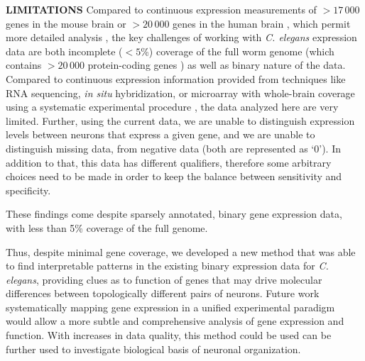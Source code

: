 \documentclass[10pt,letterpaper]{article}
\begin{document}
{\textbf{LIMITATIONS}
Compared to continuous expression measurements of $>17\,000$ genes in the mouse brain \cite{Lein:2007jn} or $>20\,000$ genes in the human brain \cite{Hawrylycz:2012ky}, which permit more detailed analysis \cite{Fulcher:2016ck, Ji:2014jw, Fakhry:2015kl, French2011, Vertes2016a, Parkes:2017dn}, the key challenges of working with \emph{C. elegans} expression data are both incomplete ($<5$\%) coverage of the full worm genome (which contains $>20\,000$ protein-coding genes \cite{Harris:2009kd}) as well as binary nature of the data. 
Compared to continuous expression information provided from techniques like RNA sequencing, \emph{in situ} hybridization, or microarray with whole-brain coverage using a systematic experimental procedure \cite{Lein:2007jn, Shen:2012ua, Tasic:2016jp}, the data analyzed here are very limited. 
Further, using the current data, we are unable to distinguish expression levels between neurons that express a given gene, and we are unable to distinguish missing data, from negative data (both are represented as `0').
In addition to that, this data has different qualifiers, therefore some arbitrary choices need to be made in order to keep the balance between sensitivity and specificity. 

These findings come despite sparsely annotated, binary gene expression data, with less than 5\% coverage of the full genome.

Thus, despite minimal gene coverage, we developed a new method that was able to find interpretable patterns in the existing binary expression data for \emph{C. elegans}, providing clues as to function of genes that may drive molecular differences between topologically different pairs of neurons.
Future work systematically mapping gene expression in a unified experimental paradigm would allow a more subtle and comprehensive analysis of gene expression and function.
With increases in data quality, this method could be used can be further used to investigate biological basis of neuronal organization.




}
\end{document}
